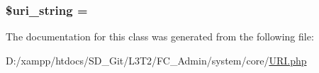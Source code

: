\subsubsection[{\$uri\+\_\+string}]{\setlength{\rightskip}{0pt plus 5cm}\${\bf uri\+\_\+string} = \textquotesingle{}\textquotesingle{}}\label{class_c_i___u_r_i_ab908b3e655463a05e8a646c965ca4e53}


The documentation for this class was generated from the following file\+:\begin{DoxyCompactItemize}
\item 
D\+:/xampp/htdocs/\+S\+D\+\_\+\+Git/\+L3\+T2/\+F\+C\+\_\+\+Admin/system/core/\hyperlink{system_2core_2_u_r_i_8php}{U\+R\+I.\+php}\end{DoxyCompactItemize}
